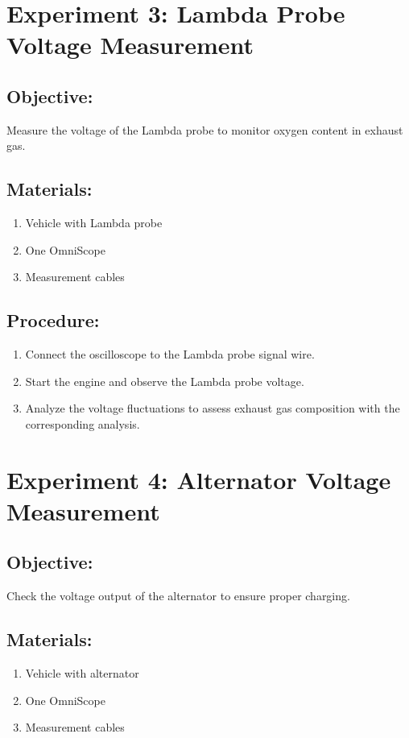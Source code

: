 \documentclass[]{scrreprt}
\begin{document}
    \section*{Experiment 3: Lambda Probe Voltage Measurement}
    \subsection*{Objective:} Measure the voltage of the Lambda probe to monitor oxygen content in exhaust gas.
    \subsection*{Materials:}
    \begin{enumerate}
        \item Vehicle with Lambda probe
        \item One OmniScope
        \item Measurement cables
    \end{enumerate}
    \subsection*{Procedure:}
    \begin{enumerate}
        \item Connect the oscilloscope to the Lambda probe signal wire.
        \item Start the engine and observe the Lambda probe voltage.
        \item Analyze the voltage fluctuations to assess exhaust gas composition with the corresponding analysis.
    \end{enumerate}

    \section*{Experiment 4: Alternator Voltage Measurement}
    \subsection*{Objective:} Check the voltage output of the alternator to ensure proper charging.
    \subsection*{Materials:}
    \begin{enumerate}
        \item Vehicle with alternator
        \item One OmniScope
        \item Measurement cables
    \end{enumerate}
\end{document}
